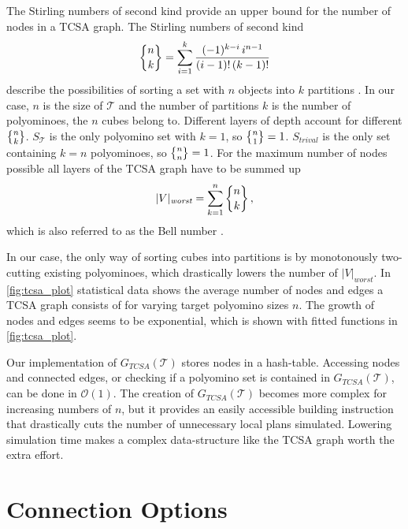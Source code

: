 The Stirling numbers of second kind provide an upper bound for the number of nodes in a TCSA graph.
The Stirling numbers of second kind
\begin{equation}
\bracenom{n}{k} = \sum_{i=1}^{k} \frac{(-1)^{k-i} \, i^{n-1}}{(i-1)! \, (k-1)!}
\end{equation}
describe the possibilities of sorting a set with $n$ objects into $k$ partitions \cite{jelliss1991}.
In our case, $n$ is the size of $\mathcal{T}$ and the number of partitions $k$ is the number of polyominoes, the $n$ cubes belong to.
Different layers of depth account for different $\bracenom{n}{k}$.
$S_\mathcal{T}$ is the only polyomino set with $k=1$, so $\bracenom{n}{1} = 1$.
$S_\textit{trival}$ is the only set containing $k=n$ polyominoes, so $\bracenom{n}{n} = 1$.
For the maximum number of nodes possible all layers of the TCSA graph have to be summed up
\begin{equation}
|V|_\textit{worst} = \sum_{k=1}^{n} \bracenom{n}{k} \, ,
\end{equation}
which is also referred to as the Bell number \cite{jelliss1991}.

In our case, the only way of sorting cubes into partitions is by monotonously two-cutting existing polyominoes, which drastically lowers the number of $|V|_\textit{worst}$.
In \autoref{fig:tcsa_plot} statistical data shows the average number of nodes and edges a TCSA graph consists of for varying target polyomino sizes $n$.
The growth of nodes and edges seems to be exponential, which is shown with fitted functions in \autoref{fig:tcsa_plot}. 

Our implementation of $G_{\textit{TCSA}}(\mathcal{T})$ stores nodes in a hash-table.
Accessing nodes and connected edges, or checking if a polyomino set is contained in $G_{\textit{TCSA}}(\mathcal{T})$, can be done in  $\mathcal{O}(1)$.
The creation of $G_{\textit{TCSA}}(\mathcal{T})$ becomes more complex for increasing numbers of $n$, but it provides an easily accessible building instruction that drastically cuts the number of unnecessary local plans simulated.
Lowering simulation time makes a complex data-structure like the TCSA graph worth the extra effort.


\section{Connection Options}
\label{sec:connect_options}

